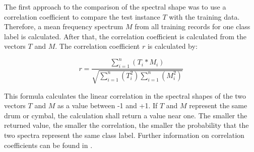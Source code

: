 
The first approach to the comparison of the spectral shape was to use a correlation coefficient to compare the test instance $T$ with the training data. Therefore, a mean frequency spectrum $M$ from all training records for one class label is calculated. After that, the correlation coefficient is calculated from the vectors $T$ and $M$. The correlation coefficient $r$ is calculated by:

\begin{equation}
\label{eq:correlationcoefficient}
	r = \frac{\sum_{i=1}^{n}{(T_i * M_i)}}{\sqrt{\sum_{i=1}^{n}{(T_i^2)}\sum_{i=1}^{n}{(M_i^2)}}}
\end{equation}


This formula calculates the linear correlation in the spectral shapes of the two vectors $T$ and $M$ as a value between -1 and +1. If $T$ and $M$ represent the same drum or cymbal, the calculation shall return a value near one. The smaller the returned value, the smaller the correlation, the smaller the probability that the two spectra represent the same class label. Further information on correlation coefficients can be found in \autocite{Hedderich:2012}. 

%
%

